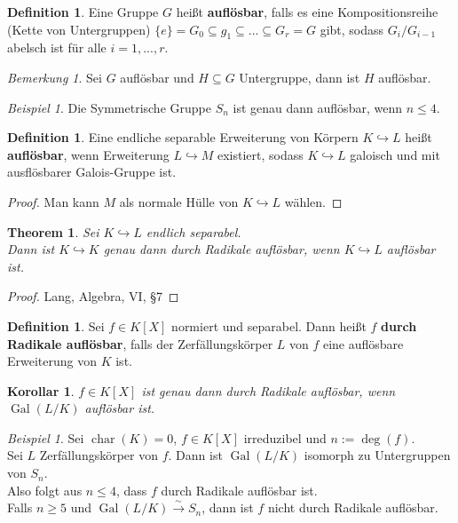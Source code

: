 \documentclass[10pt,a4paper]{article}
\newcommand{\isomfunc}{\ensuremath{\xrightarrow{\sim}}}
\newcommand{\cha}{\ensuremath{\operatorname{char}}}
\newcommand{\Gal}{\ensuremath{\operatorname{Gal}}}
\newcounter{thm}[section]
\theoremstyle{definition}
\newtheorem{definition}[thm]{Definition}
\theoremstyle{plain}
\newtheorem{kor}[thm]{Korollar}
\newtheorem{theorem}[thm]{Theorem}
\theoremstyle{remark}
\newtheorem{bem}[thm]{Bemerkung}
\newtheorem{exm}[thm]{Beispiel}
\begin{document}
\begin{definition}
	Eine Gruppe $G$ heißt \textbf{auflösbar}, falls es eine Kompositionsreihe (Kette von Untergruppen) $\{e\}=G_0\subseteq g_1\subseteq...\subseteq G_r=G$ gibt, sodass $G_i/G_{i-1}$ abelsch ist für alle $i=1,...,r$.
\end{definition}

\begin{bem}
	Sei $G$ auflösbar und $H\subseteq G$ Untergruppe, dann ist $H$ auflösbar.
\end{bem}

\begin{exm}
	Die Symmetrische Gruppe $S_n$ ist genau dann auflösbar, wenn $n\leq 4$.
\end{exm}

\begin{definition}
	Eine endliche separable Erweiterung von Körpern $K\hookrightarrow L$ heißt \textbf{auflösbar}, wenn Erweiterung $L\hookrightarrow M$ existiert, sodass $K\hookrightarrow L$ galoisch und mit ausflösbarer Galois-Gruppe ist.
\end{definition}
\begin{proof}
	Man kann $M$ als normale Hülle von $K\hookrightarrow L$ wählen.
\end{proof}

\begin{theorem}\label{1121thm}
	Sei $K\hookrightarrow L$ endlich separabel.\\
	Dann ist $K\hookrightarrow K$ genau dann durch Radikale auflösbar, wenn $K\hookrightarrow L$ auflösbar ist.
\end{theorem}
\begin{proof}
	Lang, Algebra, VI, §7
\end{proof}

\begin{definition}
	Sei $f\in K[X]$ normiert und separabel. Dann heißt $f$ \textbf{durch Radikale auflösbar}, falls der Zerfällungskörper $L$ von $f$ eine auflösbare Erweiterung von $K$ ist.
\end{definition}
\addtocounter{thm}{-1}
\begin{kor}\label{1122kor}
	$f\in K[X]$ ist genau dann durch Radikale auflösbar, wenn $\Gal(L/K)$ auflösbar ist.
\end{kor}

\begin{exm}
	Sei $\cha(K)=0$, $f\in K[X]$ irreduzibel und $n:=\deg(f)$.\\
	Sei $L$ Zerfällungskörper von $f$. Dann ist $\Gal(L/K)$ isomorph zu Untergruppen von $S_n$.\\
	Also folgt aus $n\leq 4$, dass $f$ durch Radikale auflösbar ist.\\
	Falls $n\geq 5$ und $\Gal(L/K)\isomfunc S_n$, dann ist $f$ nicht durch Radikale auflösbar.
\end{exm}
\end{document}
